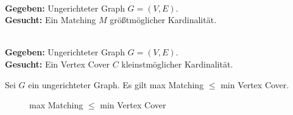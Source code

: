 \begin{problem}~\\[5pt]
	\hspace*{10pt}\textbf{Gegeben: }Ungerichteter Graph $G = (V,E)$.\\[5pt]
	\hspace*{10pt}\textbf{Gesucht: }Ein Matching $M$ größtmöglicher Kardinalität.
\end{problem}
\begin{problem}~\\[5pt]
	\hspace*{10pt}\textbf{Gegeben: }Ungerichteter Graph $G = (V,E)$.\\[5pt]
	\hspace*{10pt}\textbf{Gesucht: }Ein Vertex Cover $C$ kleinstmöglicher Kardinalität.
\end{problem}
\begin{satz}
	Sei $G$ ein ungerichteter Graph. Es gilt max Matching $\le$ min Vertex Cover.
\end{satz}
\begin{figure}[ht]
	\begin{center}
		\end{center}
	\caption{max Matching $\le$ min Vertex Cover}
\end{figure}
\newpage
